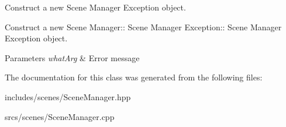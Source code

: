 Construct a new Scene Manager Exception object. 

Construct a new Scene Manager\+:\+: Scene Manager Exception\+:\+: Scene Manager Exception object.


\begin{DoxyParams}{Parameters}
{\em what\+Arg} & Error message \\
\hline
\end{DoxyParams}


The documentation for this class was generated from the following files\+:\begin{DoxyCompactItemize}
\item 
includes/scenes/Scene\+Manager.\+hpp\item 
srcs/scenes/Scene\+Manager.\+cpp\end{DoxyCompactItemize}
